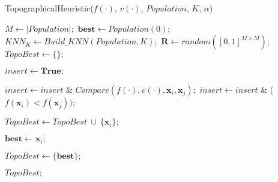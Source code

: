 \begin{breakablealgorithm}
\caption{TopographicalHeuristic($f(\cdot)$, $v(\cdot)$, $Population$, $K$, $\alpha$)}
\label{alg:TopographicalHeuristic}
\begin{spacing}{1.5}
\begin{algorithmic}[1]


\State $M \gets |Population|;$
\State $\bm{best} \gets Population(0);$
\State $KNN_K \gets Build\_KNN(Population, K);$
\State $\bm{R} \gets random([0, 1]^{M \times M});$
\State $TopoBest \gets \{\};$


\State $insert \gets \bm{True};$

		\State $insert \gets insert$ \& $Compare(f(\cdot), v(\cdot), \bm{x}_i, \bm{x}_j);$
	\Else
		\State $insert \gets insert$ \& ($f(\bm{x}_i) < f(\bm{x}_j));$
	\EndIf
\EndFor

\State $TopoBest \gets TopoBest \ \cup \ \{\bm{x}_i\};$
\EndIf

\State $\bm{best} \gets \bm{x}_i;$
\EndIf
\EndFor

	\State $TopoBest \gets \{\bm{best}\};$
\EndIf

\State \Return $TopoBest;$



\end{algorithmic}
\end{spacing}
\end{breakablealgorithm}